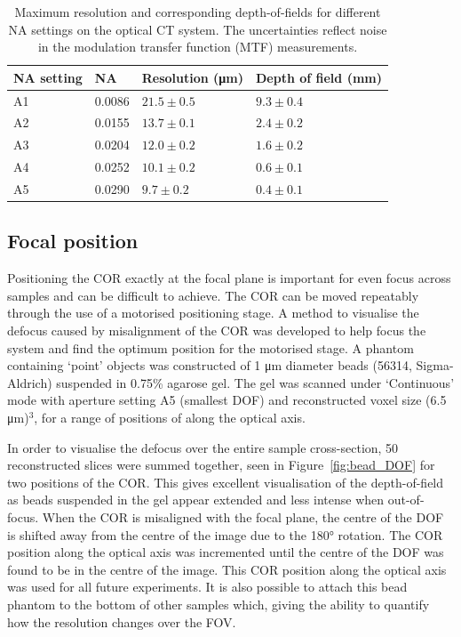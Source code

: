 	\begin{table}[H]
		\centering
		\begin{tabular}{ p{2.5cm} p{1.8cm} p{3cm} p{3cm}  }
			\hline
			\textbf{NA setting} & \textbf{NA} & \textbf{Resolution (\si{\um})} &\textbf{Depth of field} (mm)  \\ \hline
			A1  & 0.0086 & $21.5 \pm 0.5$ & $9.3 \pm 0.4$ \\ %
			A2  & 0.0155 & $13.7 \pm 0.1$ & $2.4 \pm 0.2$ \\ %
			A3  & 0.0204 & $12.0 \pm 0.2$ & $1.6 \pm 0.2$ \\ %
			A4  & 0.0252 & $10.1 \pm 0.2$ & $0.6 \pm 0.1$ \\ %
			A5  & 0.0290 & $9.7  \pm 0.2$ & $0.4 \pm 0.1$ \\ \hline		
		\end{tabular}
		\caption{Maximum resolution and corresponding depth-of-fields for different NA settings on the optical CT system. The uncertainties reflect noise in the modulation transfer function (MTF)  measurements.}
		\label{table:DOFNA}
	\end{table}





\subsection{Focal position}
\label{sec:focalpos}

Positioning the COR exactly at the focal plane is important for even focus across samples and can be difficult to achieve. The COR can be moved repeatably through the use of a motorised positioning stage. A method to visualise the defocus caused by misalignment  of the COR was developed to help focus the system and find the optimum position for the motorised stage. A phantom containing `point' objects was constructed of  1 \si{\um} diameter beads (56314, Sigma-Aldrich) suspended in 0.75\% agarose gel. %
The gel was scanned under `Continuous' mode with aperture setting A5 (smallest DOF) and reconstructed voxel size (6.5 \si{\um})$^3$, for a range of positions of along the optical axis.  %

 In order to visualise the defocus over the entire sample cross-section, 50 reconstructed slices were summed together, seen in Figure~\ref{fig:bead_DOF} for two positions of the COR. This gives excellent visualisation of the depth-of-field as beads suspended in the gel appear extended and less intense when out-of-focus. When the COR is misaligned with the focal plane, the centre of the DOF is shifted away from the centre of the image due to the \ang{180} rotation. The COR position along the optical axis was incremented until the centre of the DOF was found to be in the centre of the image. This COR position along the optical axis was used for all future experiments.
 It is also possible to attach this  bead phantom to the bottom of other samples which,  giving the ability to quantify  how the resolution changes over the FOV. 





